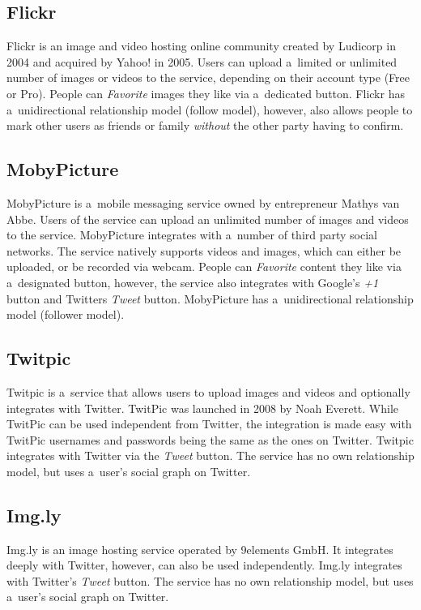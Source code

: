 \subsection{Flickr}
Flickr is an image and video hosting online community created by Ludicorp in 2004
and acquired by Yahoo! in 2005.
Users can upload a~limited or unlimited number of images or videos to the service,
depending on their account type (Free or Pro). 
People can \emph{Favorite} images they like via a~dedicated button.
Flickr has a~unidirectional relationship model (follow model), however,
also allows people to mark other users as friends or family \emph{without}
the other party having to confirm.

\subsection{MobyPicture}
MobyPicture is a~mobile messaging service owned by entrepreneur Mathys van Abbe.
Users of the service can upload an unlimited number of images and videos to the service.
MobyPicture integrates with a~number of third party social networks.
The service natively supports videos and images,
which can either be uploaded, or be recorded via webcam.
People can \emph{Favorite} content they like via a~designated button,
however, the service also integrates with Google's \emph{+1} button and
Twitters \emph{Tweet} button. 
MobyPicture has a~unidirectional relationship model (follower model).

\subsection{Twitpic}
Twitpic is a~service that allows users to upload images and videos and
optionally integrates with Twitter.
TwitPic was launched in 2008 by Noah Everett.
While TwitPic can be used independent from Twitter, the integration is made easy
with TwitPic usernames and passwords being the same as the ones on Twitter.
Twitpic integrates with Twitter via the \emph{Tweet} button.
The service has no own relationship model, but uses a~user's social graph on Twitter.

\subsection{Img.ly}
Img.ly is an image hosting service operated by 9elements GmbH.
It integrates deeply with Twitter, however, can also be used independently.
Img.ly integrates with Twitter's \emph{Tweet} button. 
The service has no own relationship model, but uses a~user's social graph on Twitter.

